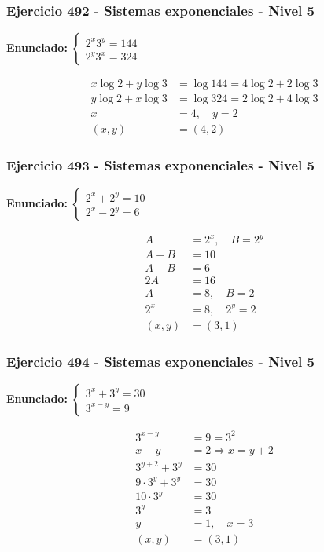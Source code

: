 \documentclass[12pt,a4paper]{article}
\begin{document}
\subsubsection*{Ejercicio 492 - Sistemas exponenciales - Nivel 5}
\textbf{Enunciado:} \(\begin{cases}2^x3^y=144\\ 2^y3^x=324\end{cases}\)

\[
\begin{aligned}
x\log2+y\log3&=\log144=4\log2+2\log3\\
y\log2+x\log3&=\log324=2\log2+4\log3\\
x&=4,
\quad y=2\\
(x,y)&=\boxed{(4,2)}
\end{aligned}
\]


\subsubsection*{Ejercicio 493 - Sistemas exponenciales - Nivel 5}
\textbf{Enunciado:} \(\begin{cases}2^x+2^y=10\\ 2^x-2^y=6\end{cases}\)

\[
\begin{aligned}
A&=2^x,
\quad B=2^y\\
A+B&=10\\
A-B&=6\\
2A&=16\\
A&=8,
\quad B=2\\
2^x&=8,
\quad 2^y=2\\
(x,y)&=\boxed{(3,1)}
\end{aligned}
\]


\subsubsection*{Ejercicio 494 - Sistemas exponenciales - Nivel 5}
\textbf{Enunciado:} \(\begin{cases}3^x+3^y=30\\ 3^{x-y}=9\end{cases}\)

\[
\begin{aligned}
3^{x-y}&=9=3^2\\
x-y&=2\Rightarrow x=y+2\\
3^{y+2}+3^y&=30\\
9\cdot3^y+3^y&=30\\
10\cdot3^y&=30\\
3^y&=3\\
y&=1,
\quad x=3\\
(x,y)&=\boxed{(3,1)}
\end{aligned}
\]
\end{document}
